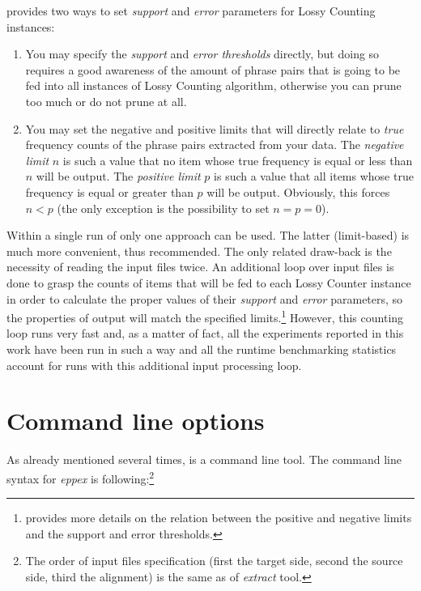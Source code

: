 \Eppex{} provides two ways to set \emph{support} and \emph{error} parameters
for Lossy Counting instances:
\begin{enumerate}
  \item You may specify the \emph{support} and \emph{error thresholds} directly, but doing so
    requires a good awareness of the amount of phrase pairs that is going to be fed into all
    instances of Lossy Counting algorithm, otherwise you can prune too much or do not prune at all.
  \item You may set the negative and positive limits that will directly relate to \emph{true}
    frequency counts of the phrase pairs extracted from your data. The \emph{negative limit}
    $n$ is such a value that no item whose true frequency is equal or less than $n$ will be output.
    The \emph{positive limit} $p$ is such a value that all items whose true frequency is equal
    or greater than $p$ will be output. Obviously, this forces $n < p$ (the only exception
    is the possibility to set $n = p = 0$).
\end{enumerate}

Within a single run of \eppex{} only one approach can be used.
The latter (limit-based) is much more convenient, thus recommended.
The only related draw-back is the necessity of reading the input files twice.
An additional loop over input files is done to grasp the counts of items
that will be fed to each Lossy Counter instance in order to calculate
the proper values of their \emph{support} and \emph{error} parameters,
so the properties of output will match the specified limits.\footnote{
provides more details on the relation between the positive and negative limits and
the support and error thresholds.}
However, this counting loop runs very fast and, as a matter of fact, all the \eppex{}
experiments reported in this work have been run in such a way and all the runtime
benchmarking statistics account for runs with this additional input processing loop.

\section{Command line options}

As already mentioned several times, \eppex{} is a command line tool.
The command line syntax for \emph{eppex} is following:\footnote{The order
of input files specification (first the target side, second the source side, third the alignment)
is the same as of \emph{extract} tool.}

